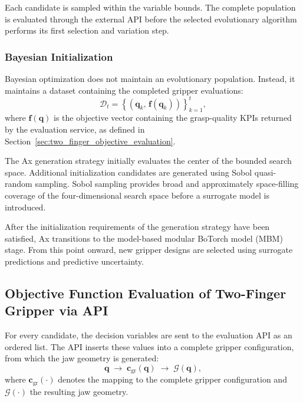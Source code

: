 Each candidate is sampled within the variable bounds. The complete population is evaluated through
the external API before the selected evolutionary algorithm performs its first selection and
variation step.

\subsubsection{Bayesian Initialization}

Bayesian optimization does not maintain an evolutionary population. Instead, it maintains a dataset
containing the completed gripper evaluations:
\begin{equation}
    \mathcal{D}_t
    =
    \left\{
        \left(
            \mathbf{q}_k,\,
            \mathbf{f}(\mathbf{q}_k)
        \right)
    \right\}_{k=1}^{t},
\end{equation}
where $\mathbf{f}(\mathbf{q})$ is the objective vector containing the grasp-quality KPIs returned by
the evaluation service, as defined in Section~\ref{sec:two_finger_objective_evaluation}.

The Ax generation strategy initially evaluates the center of the bounded search space. Additional
initialization candidates are generated using Sobol quasi-random sampling. Sobol sampling provides
broad and approximately space-filling coverage of the four-dimensional search space before a
surrogate model is introduced.

After the initialization requirements of the generation strategy have been satisfied, Ax transitions
to the model-based modular BoTorch model (MBM) stage. From this point onward, new gripper designs
are selected using surrogate predictions and predictive uncertainty.

\subsection{Objective Function Evaluation of Two-Finger Gripper via API}
\label{sec:two_finger_api_evaluation}

For every candidate, the decision variables are sent to the evaluation API as an ordered list. The
API inserts these values into a complete gripper configuration, from which the jaw geometry is
generated:
\begin{equation}
    \mathbf{q}
    \;\longrightarrow\;
    \mathbf{c}_{\mathrm{gr}}(\mathbf{q})
    \;\longrightarrow\;
    \mathcal{G}(\mathbf{q}),
\end{equation}
where $\mathbf{c}_{\mathrm{gr}}(\cdot)$ denotes the mapping to the complete gripper configuration
and $\mathcal{G}(\cdot)$ the resulting jaw geometry.

